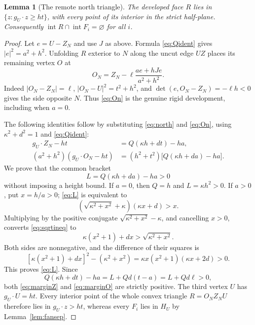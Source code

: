 \documentclass[11pt]{amsart}
\newtheorem{lemma}[theorem]{Lemma}
\newcommand{\inter}{\operatorname{int}}
\begin{document}
\begin{lemma}[The remote north triangle]\label{lem:remotenorth}
The developed face \(R\) lies in \(\{z:g_U\cdot z\ge ht\}\), with every point of its interior in the strict half-plane. Consequently \(\inter R\cap\inter F_i=\varnothing\) for all \(i\).
\end{lemma}
\begin{proof}
Let \(e=U-Z_N\) and use \(J\) as above. Formula \eqref{eq:Qident} gives \(|e|^2=a^2+h^2\). Unfolding \(R\) exterior to \(N\) along the uncut edge \(UZ\) places its remaining vertex \(O\) at
\begin{equation}\label{eq:On}
 O_N=Z_N-\ell\frac{ae+hJe}{a^2+h^2}.
\end{equation}
Indeed \(|O_N-Z_N|=\ell\), \(|O_N-U|^2=t^2+h^2\), and \(\det(e,O_N-Z_N)=-\ell h<0\) gives the side opposite \(N\). Thus \eqref{eq:On} is the genuine rigid development, including when \(a=0\).

The following identities follow by substituting \eqref{eq:north} and \eqref{eq:On}, using \(\kappa^2+d^2=1\) and \eqref{eq:Qident}:
\begin{align}
 g_U\cdot Z_N-ht&=Q(\kappa h+dt)-ha,\label{eq:marginZ}\\
 (a^2+h^2)(g_U\cdot O_N-ht)
 &=(h^2+t^2)\bigl[Q(\kappa h+da)-ha\bigr].\label{eq:marginO}
\end{align}
We prove that the common bracket
\begin{equation}\label{eq:L}
 L=Q(\kappa h+da)-ha>0
\end{equation}
without imposing a height bound. If \(a=0\), then \(Q=h\) and \(L=\kappa h^2>0\). If \(a>0\), put \(x=h/a>0\); \eqref{eq:L} is equivalent to
\begin{equation}\label{eq:sqrtineq}
 (\sqrt{\kappa^2+x^2}+\kappa)(\kappa x+d)>x.
\end{equation}
Multiplying by the positive conjugate \(\sqrt{\kappa^2+x^2}-\kappa\), and cancelling \(x>0\), converts \eqref{eq:sqrtineq} to
\[
 \kappa(x^2+1)+dx>\sqrt{\kappa^2+x^2}.
\]
Both sides are nonnegative, and the difference of their squares is
\begin{equation}\label{eq:positivity}
 [\kappa(x^2+1)+dx]^2-(\kappa^2+x^2)
 =\kappa x(x^2+1)(\kappa x+2d)>0.
\end{equation}
This proves \eqref{eq:L}. Since
\[
 Q(\kappa h+dt)-ha=L+Qd(t-a)=L+Qd\ell>0,
\]
both \eqref{eq:marginZ} and \eqref{eq:marginO} are strictly positive. The third vertex \(U\) has \(g_U\cdot U=ht\). Every interior point of the whole convex triangle \(R=O_NZ_NU\) therefore lies in \(g_U\cdot z>ht\), whereas every \(F_i\) lies in \(H_U\) by Lemma~\ref{lem:fansep}.
\end{proof}
\end{document}
